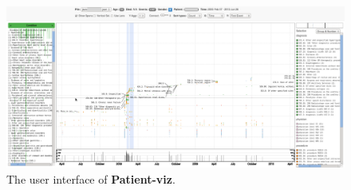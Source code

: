 \begin{figure}[hb!]
\centering
\includegraphics[width=0.9\linewidth]{figs/patientviz/p2-1_anon}
\caption{
The user interface of \textbf{Patient-viz}.
}
\label{figs:patientviz_overview}
\end{figure}
